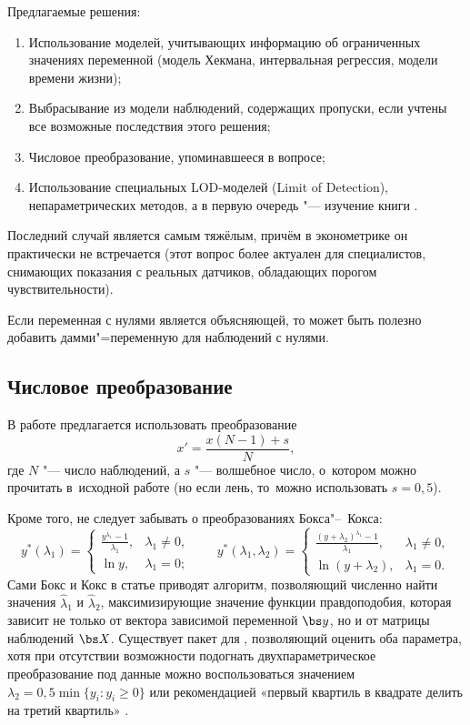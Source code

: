 \documentclass[11pt]{article}
\begin{document}
Предлагаемые решения:
\begin{enumerate}
	\item Использование моделей, учитывающих информацию об ограниченных значениях переменной (модель Хекмана, интервальная регрессия, модели времени жизни);
	\item Выбрасывание из модели наблюдений, содержащих пропуски, если учтены все возможные последствия этого решения;
	\item Числовое преобразование, упоминавшееся в вопросе;
	\item Использование специальных LOD-моделей (Limit of Detection), непараметрических методов, а в первую очередь "--- изучение книги \citep{nondetect05}.
\end{enumerate}

Последний случай является самым тяжёлым, причём в эконометрике он практически не встречается (этот вопрос более актуален для специалистов, снимающих показания с реальных датчиков, обладающих порогом чувствительности).

Если переменная с нулями является объясняющей, то может быть полезно добавить дамми"=переменную для наблюдений с нулями. 

\subsection{Числовое преобразование}

В работе \citep{squeezer06} предлагается использовать преобразование 
\begin{equation}
	x' = \frac{x(N-1) + s}{N},
\end{equation}
где $N$ "--- число наблюдений, а $s$ "--- волшебное число, о~котором можно прочитать в~исходной работе (но если лень, то~можно использовать $s=0{,}5$). 

Кроме того, не следует забывать о преобразованиях Бокса"--~Кокса:
\[
y^*(\lambda_1) = \begin{cases} 
\frac {y^{\lambda_1} - 1} {\lambda_{1}}, & \lambda_{1} \neq 0, \\
\ln y , &  \lambda_{1} = 0;
\end{cases} \qquad
y^*(\lambda_{1}, \lambda_{2}) = \begin{cases} 
\frac {(y+\lambda_{2})^{\lambda_1} - 1} {\lambda_{1}}, & \lambda_{1} \neq 0, \\
\ln (y + \lambda_{2}), &  \lambda_{1} = 0.
\end{cases}
\]
Сами Бокс и Кокс в статье \citep{boxcox64} приводят алгоритм, позволяющий численно найти значения $\hat\lambda_1$ и $\hat\lambda_2$, максимизирующие значение функции правдоподобия, которая зависит не только от вектора зависимой переменной $\bs y$, но и от матрицы наблюдений $\bs X$. Существует пакет  для , позволяющий оценить оба параметра, хотя при отсутствии возможности подогнать двухпараметрическое преобразование под данные можно воспользоваться значением $\lambda_2 = 0{,}5\min\{y_i\colon y_i \ge 0\}$ или рекомендацией «первый квартиль в квадрате делить на третий квартиль» \citep{stahel13}.
\end{document}
